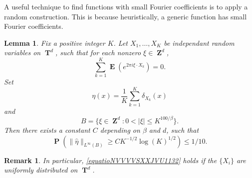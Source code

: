 \documentclass[12pt,reqno]{article}
\numberwithin{equation}{section}
\DeclareMathOperator{\ZZ}{\mathbf{Z}}
\DeclareMathOperator{\TT}{\mathbf{T}}
\newtheorem{lemma}[theorem]{Lemma}
\newtheorem{remark}[theorem]{Remark}
\numberwithin{theorem}{section}
\DeclareMathOperator{\EE}{\mathbf{E}}
\DeclareMathOperator{\PP}{\mathbf{P}}
\begin{document}
A useful technique to find functions with small Fourier coefficients is to apply a random construction. This is because heuristically, a generic function has small Fourier coefficients.

\begin{lemma} \label{LemmaGISCICS1}
    Fix a positive integer $K$. Let $X_1, \dots, X_K$ be independant random variables on $\TT^d$, such that for each nonzero $\xi \in \ZZ^d$,
    \begin{equation} \label{equatioNVVVVSXXJVU1132}
        \sum_{k = 1}^K \EE \left( e^{2 \pi i \xi \cdot X_k} \right) = 0.
    \end{equation}
    Set
    \[ \eta(x) = \frac{1}{K} \sum_{k = 1}^K \delta_{X_k}(x) \]
    and
    \[ B = \{ \xi \in \ZZ^d: 0 < |\xi| \leq K^{100/\beta} \}. \]
    Then there exists a constant $C$ depending on $\beta$ and $d$, such that%
    \[ \PP \left( \| \widehat{\eta} \|_{L^\infty(B)} \geq C K^{-1/2} \log(K)^{1/2} \right) \leq 1/10. \]
\end{lemma}

\begin{remark}
    In particular, \eqref{equatioNVVVVSXXJVU1132} holds if the $\{ X_i \}$ are uniformly distributed on $\TT^d$.
\end{remark}
\end{document}
